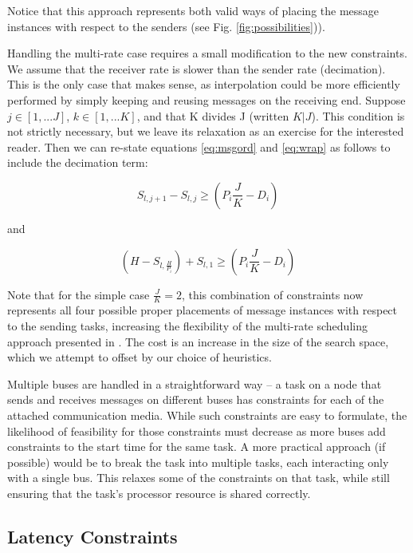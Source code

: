 Notice that this approach represents both valid ways of placing the message instances with respect to the 
senders (see Fig. \ref{fig:possibilities})).

Handling the multi-rate case requires a small modification to the new constraints.  We assume that the 
receiver rate is slower than the sender rate (decimation). This is the only case that makes sense, as 
interpolation could be more efficiently performed by simply keeping and reusing messages on the receiving 
end.  Suppose $j \in [1,...J]$, $k \in [1,...K]$, and that K divides J (written $K|J$).  This condition 
is not strictly necessary, but we leave its relaxation as an exercise for the interested reader.  Then we 
can re-state equations \ref{eq:msgord} and \ref{eq:wrap} as follows to include the decimation term:

\begin{equation}
S_{l,j + 1}  - S_{l,j}  \geqslant (P_i \frac{J}{K} - D_i )
\end{equation}

and

\begin{equation}
(H - S_{l,\frac{H}{{P_i }}} ) + S_{l,1}  \geqslant (P_i \frac{J}{K} - D_i )
\end{equation}

Note that for the simple case $\frac{J}{K} = 2$, this combination of constraints now represents all four 
possible proper placements of message instances with respect to the sending tasks, increasing the 
flexibility of the multi-rate scheduling approach presented in \cite{sched:offline}.  The cost is an 
increase in the size of the search space, which we attempt to offset by our choice of heuristics.

Multiple buses are handled in a straightforward way -- a task on a node that sends and receives messages 
on different buses has constraints for each of the attached communication media.  While such constraints 
are easy to formulate, the likelihood of feasibility for those constraints must decrease as more buses 
add constraints to the start time for the same task.  A more practical approach (if possible) would be to 
break the task into multiple tasks, each interacting only with a single bus.  This relaxes some of the 
constraints on that task, while still ensuring that the task's processor resource is shared correctly.


\subsection{Latency Constraints}

